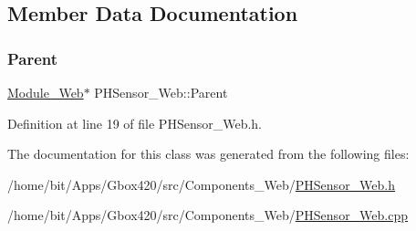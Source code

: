 \subsection{Member Data Documentation}
\mbox{\label{class_p_h_sensor___web_aed4c44d8d7b1176ba92c7de9d76eb47f}} 
\subsubsection{\texorpdfstring{Parent}{Parent}}
{\footnotesize\ttfamily \hyperlink{class_module___web}{Module\+\_\+\+Web}$\ast$ P\+H\+Sensor\+\_\+\+Web\+::\+Parent\hspace{0.3cm}{\ttfamily [protected]}}



Definition at line 19 of file P\+H\+Sensor\+\_\+\+Web.\+h.



The documentation for this class was generated from the following files\+:\begin{DoxyCompactItemize}
\item 
/home/bit/\+Apps/\+Gbox420/src/\+Components\+\_\+\+Web/\hyperlink{_p_h_sensor___web_8h}{P\+H\+Sensor\+\_\+\+Web.\+h}\item 
/home/bit/\+Apps/\+Gbox420/src/\+Components\+\_\+\+Web/\hyperlink{_p_h_sensor___web_8cpp}{P\+H\+Sensor\+\_\+\+Web.\+cpp}\end{DoxyCompactItemize}
